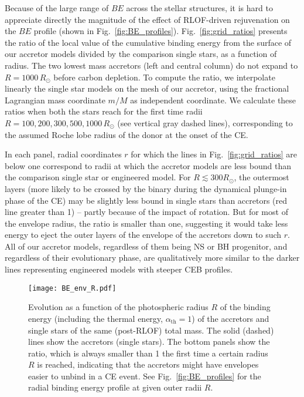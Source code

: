 \documentclass[twocolumn,twocolappendix,trackchanges]{aastex63}
\DeclareRobustCommand{\Figref}[1]{Fig.~\ref{#1}}
\begin{document}
Because of the large range of $BE$ across the stellar structures, it
is hard to appreciate directly the magnitude of the effect of RLOF-driven
rejuvenation on the $BE$ profile (shown in \Figref{fig:BE_profiles}). \Figref{fig:grid_ratios} presents the
ratio of the local value of the cumulative binding energy from the
surface of our accretor models divided by the
comparison single stars, as a function of radius. The two
lowest mass accretors (left and central column) do not expand to
$R=1000\, R_\odot$ before carbon depletion. To compute the
ratio, we interpolate linearly the single star models on the mesh of
our accretor, using the fractional Lagrangian mass coordinate $m/M$ as
independent coordinate.
We calculate these ratios
when both the stars reach for the first time radii
$R=100, 200, 300, 500, 1000\,R_\odot$ (see vertical gray dashed
lines), corresponding to the assumed Roche lobe radius of the donor at
the onset of the CE.

In each panel, radial coordinates $r$ for which the lines in
\Figref{fig:grid_ratios} are below one correspond to radii at which
the accretor models are less bound than the comparison single star or
engineered model. For $R\lesssim 300R_\odot$, the outermost layers
(more likely to be crossed by the binary during the dynamical
plunge-in phase of the CE) may be slightly less bound in single stars
than accretors (red line greater than 1) -- partly because of
the impact of rotation. But for most of the envelope
radius, the ratio is smaller than one, suggesting it would take less
energy to eject the outer layers of the envelope of the accretors down
to such $r$. All of our accretor models, regardless of them being NS
or BH progenitor, and regardless of their evolutionary phase,
are qualitatively more similar to the darker lines
representing engineered models with steeper CEB profiles.


\begin{figure}[htbp]
  \centering
  \texttt{[image: BE\_env\_R.pdf]}
  \caption{Evolution as a function of the photospheric radius $R$ of
    the binding energy (including the thermal energy,
    $\alpha_\mathrm{th}=1$) of the accretors and single stars of the
    same (post-RLOF) total mass. The solid (dashed) lines show the
    accretors (single stars). The bottom panels show the ratio, which
    is always smaller than 1 the first time a certain radius $R$ is
    reached, indicating that the accretors might have envelopes easier
    to unbind in a CE event. See \Figref{fig:BE_profiles}
    for the radial binding energy profile at given outer radii $R$.}
  \label{fig:BE_env_R}
\end{figure}
\end{document}
